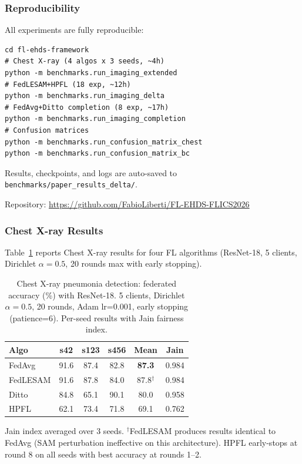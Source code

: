 \documentclass[conference]{IEEEtran}
\begin{document}
\subsubsection{Reproducibility}

All experiments are fully reproducible:
{\scriptsize
\begin{verbatim}
cd fl-ehds-framework
# Chest X-ray (4 algos x 3 seeds, ~4h)
python -m benchmarks.run_imaging_extended
# FedLESAM+HPFL (18 exp, ~12h)
python -m benchmarks.run_imaging_delta
# FedAvg+Ditto completion (8 exp, ~17h)
python -m benchmarks.run_imaging_completion
# Confusion matrices
python -m benchmarks.run_confusion_matrix_chest
python -m benchmarks.run_confusion_matrix_bc
\end{verbatim}
}

Results, checkpoints, and logs are auto-saved to \texttt{benchmarks/paper\_results\_delta/}.

Repository: \url{https://github.com/FabioLiberti/FL-EHDS-FLICS2026}

\subsubsection{Chest X-ray Results}
\label{sec:imaging_results}

Table~\ref{tab:imaging_chest} reports Chest X-ray results for four FL algorithms (ResNet-18, 5 clients, Dirichlet $\alpha{=}0.5$, 20 rounds max with early stopping).

\begin{table}[htbp]
\centering
\caption{Chest X-ray pneumonia detection: federated accuracy (\%) with ResNet-18. 5 clients, Dirichlet $\alpha{=}0.5$, 20 rounds, Adam lr=0.001, early stopping (patience=6). Per-seed results with Jain fairness index.}
\label{tab:imaging_chest}
\small
\begin{tabular}{lccccc}
\toprule
\textbf{Algo} & \textbf{s42} & \textbf{s123} & \textbf{s456} & \textbf{Mean} & \textbf{Jain} \\
\midrule
FedAvg & 91.6 & 87.4 & 82.8 & \textbf{87.3} & 0.984 \\
FedLESAM & 91.6 & 87.8 & 84.0 & 87.8$^\dagger$ & 0.984 \\
Ditto & 84.8 & 65.1 & 90.1 & 80.0 & 0.958 \\
HPFL & 62.1 & 73.4 & 71.8 & 69.1 & 0.762 \\
\bottomrule
\end{tabular}

\vspace{1mm}
\footnotesize{Jain index averaged over 3 seeds. $^\dagger$FedLESAM produces results identical to FedAvg (SAM perturbation ineffective on this architecture). HPFL early-stops at round 8 on all seeds with best accuracy at rounds 1--2.}
\end{table}
\end{document}
